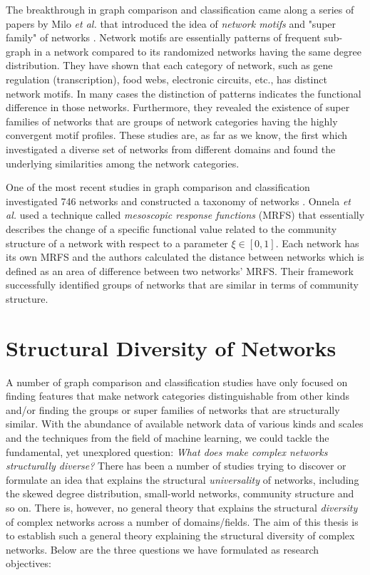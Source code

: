 	The breakthrough in graph comparison and classification came along a series of papers by Milo \textit{et al.} that introduced the idea of \textit{network motifs} and "super family" of networks \cite{Milo_motif, Milo_SuperFamily}. Network motifs are essentially patterns of frequent sub-graph in a network compared to its randomized networks having the same degree distribution\cite{Milo_motif}. They have shown that each category of network, such as gene regulation (transcription), food webs, electronic circuits, etc., has distinct network motifs. In many cases the distinction of patterns indicates the functional difference in those networks. Furthermore, they revealed the existence of super families of networks that are groups of network categories having the highly convergent motif profiles. These studies are, as far as we know, the first which investigated a diverse set of networks from different domains and found the underlying similarities among the network categories.
	
	One of the most recent studies in graph comparison and classification investigated 746 networks and constructed a taxonomy of networks \cite{Onnela_Taxonomy}.  Onnela \textit{et al.} used a technique called \textit{mesoscopic response functions} (MRFS) that essentially describes the change of a specific functional value related to the community structure of a network with respect to a parameter $\xi \in [0,1]$. Each network has its own MRFS and the authors calculated the distance between networks which is defined as an area of difference between two networks' MRFS. Their framework successfully identified groups of networks that are similar in terms of community structure.

	
	
	\section{Structural Diversity of Networks}
	A number of graph comparison and classification studies have only focused on finding features that make network categories distinguishable from other kinds and/or finding the groups or super families of networks that are structurally similar. With the abundance of available network data of various kinds and scales and the techniques from the field of machine learning, we could tackle the fundamental, yet unexplored question: \textit{What does make complex networks structurally diverse?} There has been a number of studies trying to discover or formulate an idea that explains the structural \textit{universality} of networks, including the skewed degree distribution, small-world networks, community structure and so on. There is, however, no general theory that explains the structural \textit{diversity} of complex networks across a number of domains/fields. The aim of  this thesis is to establish such a general theory explaining the structural diversity of complex networks. Below are the three  questions we have formulated as research objectives:


